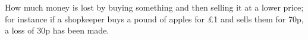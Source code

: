 How much money is lost by buying something and then selling it at a
lower price; for instance if a shopkeeper buys a pound of apples for
\pounds 1 and sells them for 70p, a loss of 30p has been made.